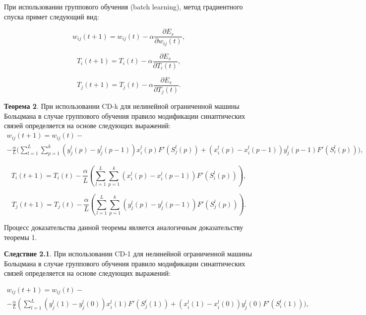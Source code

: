 При использовании группового обучения (batch learning), метод градиентного спуска примет следующий вид:

\begin{equation}
    w_{ij}(t+1)=w_{ij}(t)-\alpha\frac{\partial E_s}{\partial w_{ij}(t)},
\end{equation}

\begin{equation}
    T_{i}(t+1)=T_{i}(t)-\alpha\frac{\partial E_s}{\partial T_{i}(t)},
\end{equation}

\begin{equation}
    T_{j}(t+1)=T_{j}(t)-\alpha\frac{\partial E_s}{\partial T_{j}(t)}.
\end{equation}

\textbf{Теорема 2}. При использовании  CD-k для нелинейной ограниченной машины Больцмана в случае группового обучения правило модификации синаптических связей определяется на основе следующих выражений:
\begin{multline*}
    w_{ij}(t+1)=w_{ij}(t)-\\-\frac{\alpha}{L}\Bigg(\sum_{l=1}^L\sum_{p=1}^k (y_j^l(p)-y_j^l(p-1))x_i^l(p)F'(S_j^l(p))+(x_i^l(p)-x_i^l(p-1))y_j^l(p-1)F'(S_i^l(p))\Bigg),
\end{multline*}

\begin{equation*}
    T_{i}(t+1)=T_{i}(t)-\frac{\alpha}{L}\left(\sum_{l=1}^L\sum_{p=1}^k (x_i^l(p)-x_i^l(p-1))F'(S_i^l(p))\right),
\end{equation*}

\begin{equation*}
    T_{j}(t+1)=T_{j}(t)-\frac{\alpha}{L}\left(\sum_{l=1}^L\sum_{p=1}^k (y_j^l(p)-y_j^l(p-1))F'(S_j^l(p))\right).
\end{equation*}

Процесс доказательства данной теоремы является аналогичным доказательству теоремы 1.

\textbf{Следствие 2.1}. При использовании  CD-1 для нелинейной ограниченной машины Больцмана в случае группового обучения правило модификации синаптических связей определяется на основе следующих выражений:

\begin{multline*}
    w_{ij}(t+1)=w_{ij}(t)-\\-\frac{\alpha}{L}\left(\sum_{l=1}^L (y_j^l(1)-y_j^l(0))x_i^l(1)F'(S_j^l(1))+(x_i^l(1)-x_i^l(0))y_j^l(0)F'(S_i^l(1))\Bigg)\right.,
\end{multline*}

